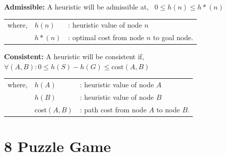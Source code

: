 \textbf{Admissible:}
A heuristic will be admissible at, \ $0 \leq h(n) \leq h*(n)$\\
\begin{tabular}{lll}
   where,& $h(n)$ &: heuristic value of node $n$ \\
         & $h*(n)$ &: optimal cost from node $n$ to goal node.
\end{tabular}

\textbf{Consistent:}
A heuristic will be consistent if, \ $\forall(A,B): 0 \leq h(S) - h(G) \leq \text{cost}(A,B)$\\
\begin{tabular}{lll}
   where,& $h(A)$ &: heuristic value of node $A$ \\
         & $h(B)$ &: heuristic value of node $B$ \\
         & cost$(A,B)$ &: path cost from node $A$ to node $B$.
\end{tabular}

\section{8 Puzzle Game}

